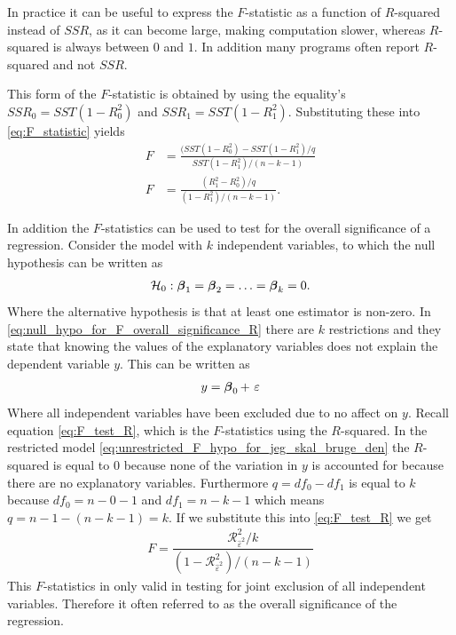 In practice it can be useful to express the $F$-statistic as a function of $R$-squared instead of $SSR$, as it can become large, making computation slower, whereas $R$-squared is always between $0$ and $1$. In addition many programs often report $R$-squared and not $SSR$.

This form of the $F$-statistic is obtained by using the equality's $SSR_0 = SST(1 - R^2_0)$ and $SSR_1 = SST(1-R^2_1)$. Substituting these into \eqref{eq:F_statistic} yields
\begin{align}\label{eq:F_test_R}
    F &= \frac{(SST(1 - R^2_0) - SST(1-R^2_1)/q}{SST(1-R^2_1)/(n-k-1)} \nonumber \\
    F &= \frac{(R^2_1 - R^2_0)/q}{(1 - R^2_1)/(n-k-1)}.
\end{align}

In addition the $F$-statistics can be used to test for the overall significance of a regression. 
Consider the model with $k$ independent variables, to which the null hypothesis can be written as
\begin{align}\label{eq:null_hypo_for_F_overall_significance_R}
    \mathcal{H}_0: \operatorname{\boldsymbol{\beta}}_1 = \operatorname{\boldsymbol{\beta}}_2 = \ldots = \operatorname{\boldsymbol{\beta}}_k = 0.
\end{align}
Where the alternative hypothesis is that at least one estimator is non-zero. In \eqref{eq:null_hypo_for_F_overall_significance_R} there are $k$ restrictions and they state that knowing the values of the explanatory variables does not explain the dependent variable $y$. This can be written as
\begin{align}\label{eq:unrestricted_F_hypo_for_jeg_skal_bruge_den}
    y = \operatorname{\boldsymbol{\beta}}_0 + \ \varepsilon
\end{align}
Where all independent variables have been excluded due to no affect on $y$. 
Recall equation \eqref{eq:F_test_R}, which is the $F$-statistics using the $R$-squared. 
In the restricted model \eqref{eq:unrestricted_F_hypo_for_jeg_skal_bruge_den} the $R$-squared is equal to $0$ because none of the variation in $y$ is accounted for because there are no explanatory variables. 
Furthermore $q = df_0 - df_{1}$ is equal to $k$ because $df_0 = n-0-1$ and $df_{1} = n-k-1$ which means $q = n-1 - (n-k-1) = k$. If we substitute this into \eqref{eq:F_test_R} we get
\begin{align}\label{eq:udvidelse_til_F_stat}
    F = \dfrac{\mathcal{R}^2_{\hat{\varepsilon}^2}/k}{(1-\mathcal{R}^2_{\hat{\varepsilon}^2}) / (n-k-1)}
\end{align}
This $F$-statistics in only valid in testing for joint exclusion of all independent variables. 
Therefore it often referred to as the overall significance of the regression.

